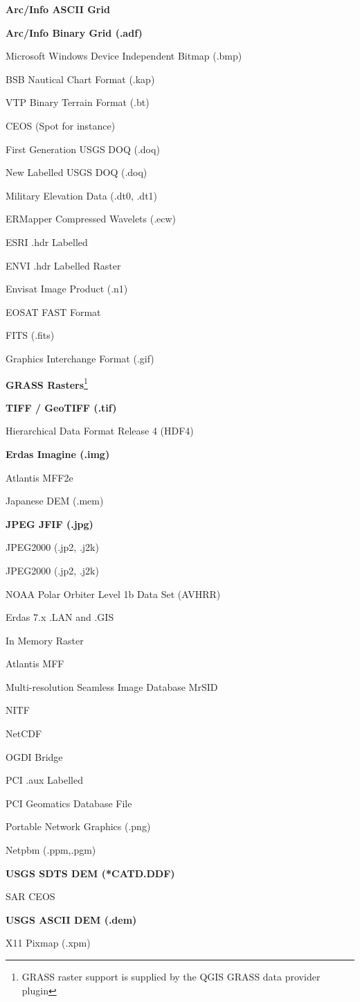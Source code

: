 \documentclass[10pt,english]{article}
\begin{document}
\begin{onehalfspace}
\begin{compactitem}
\item \textbf{Arc/Info ASCII Grid}
\item \textbf{Arc/Info Binary Grid (.adf)}
\item Microsoft Windows Device Independent Bitmap (.bmp)
\item BSB Nautical Chart Format (.kap)
\item VTP Binary Terrain Format (.bt)
\item CEOS (Spot for instance)
\item First Generation USGS DOQ (.doq)
\item New Labelled USGS DOQ (.doq)
\item Military Elevation Data (.dt0, .dt1)
\item ERMapper Compressed Wavelets (.ecw)
\item ESRI .hdr Labelled
\item ENVI .hdr Labelled Raster
\item Envisat Image Product (.n1)
\item EOSAT FAST Format
\item FITS (.fits)
\item Graphics Interchange Format (.gif)
\item \textbf{GRASS Rasters}\footnote{GRASS raster support is supplied by the QGIS GRASS data provider plugin} 
\item \textbf{TIFF / GeoTIFF (.tif)}
\item Hierarchical Data Format Release 4 (HDF4)
\item \textbf{Erdas Imagine (.img)}
\item Atlantis MFF2e
\item Japanese DEM (.mem)
\item \textbf{JPEG JFIF (.jpg)}
\item JPEG2000 (.jp2, .j2k)
\item JPEG2000 (.jp2, .j2k)
\item NOAA Polar Orbiter Level 1b Data Set (AVHRR)
\item Erdas 7.x .LAN and .GIS
\item In Memory Raster
\item Atlantis MFF
\item Multi-resolution Seamless Image Database  MrSID
\item NITF
\item NetCDF
\item OGDI Bridge
\item PCI .aux Labelled
\item PCI Geomatics Database File
\item Portable Network Graphics (.png)
\item Netpbm (.ppm,.pgm)
\item \textbf{USGS SDTS DEM (*CATD.DDF)}
\item SAR CEOS
\item \textbf{USGS ASCII DEM (.dem)}
\item X11 Pixmap (.xpm)


\end{compactitem}
\end{onehalfspace}
\end{document}
